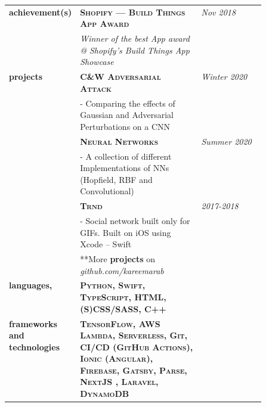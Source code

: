 \documentclass{article}
\begin{document}
\begin{longtable}{@{}>{\raggedleft}p{0.25\linewidth}
                          p{}>{}p{0.25\linewidth}@{}}
        \textbf{achievement(s)}
            & \textbf{\textsc{Shopify --- Build Things App Award}} & \textit{Nov 2018}\\ 
            & \textit{Winner of the best App award @ Shopify's Build Things App Showcase} \\ [1em]
        
        \textbf{projects} 
            & \textbf{\textsc{C\&W Adversarial Attack}} & \textit{Winter 2020}\\
            & - Comparing the effects of Gaussian and Adversarial Perturbations on a CNN \\ [1em]

            & \textbf{\textsc{Neural Networks}} & \textit{Summer 2020}\\
            & - A collection of different Implementations of NNs (Hopfield, RBF and Convolutional) \\ [1em]
            
            & \textbf{\textsc{Trnd}} & \textit{2017-2018}\\
            & - Social network built only for GIFs. Built on iOS using Xcode -- Swift \\ [1em]
            
            & **More \textbf{projects} on \textit{github.com/kareemarab}\\ [1em]
            
        \textbf{languages,} 
            & \textbf{\textsc{Python, Swift, TypeScript, HTML, (S)CSS/SASS, C++}} \\
        \textbf{frameworks and technologies}
            & \textbf{\textsc{TensorFlow, AWS Lambda, Serverless, Git, CI/CD (GitHub Actions), Ionic (Angular), Firebase, Gatsby, Parse, NextJS , Laravel, DynamoDB}}\\ [1em]
        
  \end{longtable}
  
\end{document}
